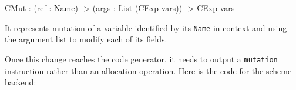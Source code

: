 \documentclass[
]{article}
\newenvironment{Shaded}{}{}
\newcommand{\DataTypeTok}[1]{\textcolor[rgb]{0.56,0.13,0.00}{#1}}
\newcommand{\NormalTok}[1]{#1}
\newcommand{\OperatorTok}[1]{\textcolor[rgb]{0.40,0.40,0.40}{#1}}
\newcommand{\OtherTok}[1]{\textcolor[rgb]{0.00,0.44,0.13}{#1}}
\begin{document}
\begin{Shaded}
\begin{Highlighting}[]
\DataTypeTok{CMut} \OperatorTok{:}\NormalTok{ (ref }\OperatorTok{:} \DataTypeTok{Name}\NormalTok{) }\OtherTok{{-}\textgreater{}}\NormalTok{ (args }\OperatorTok{:} \DataTypeTok{List}\NormalTok{ (}\DataTypeTok{CExp}\NormalTok{ vars)) }\OtherTok{{-}\textgreater{}} \DataTypeTok{CExp}\NormalTok{ vars }
\end{Highlighting}
\end{Shaded}

It represents mutation of a variable identified by its \texttt{Name} in
context and using the argument list to modify each of its fields.

Once this change reaches the code generator, it needs to output a
\texttt{mutation} instruction rather than an allocation operation. Here
is the code for the scheme backend:
\end{document}
